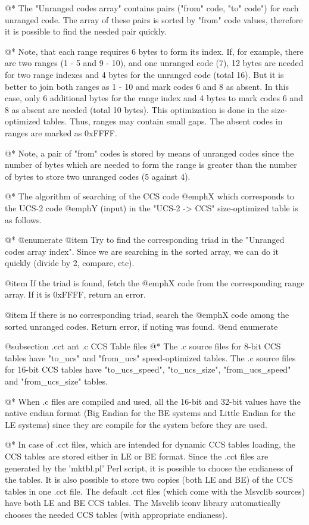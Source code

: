 @*
The "Unranged codes array" contains pairs ("from" code, "to" code") for
each unranged code. The array of these pairs is sorted by "from" code
values, therefore it is possible to find the needed pair quickly.

@*
Note, that each range requires 6 bytes to form its index. If, for
example, there are two ranges (1 - 5 and 9 - 10), and one unranged code
(7), 12 bytes are needed for two range indexes and 4 bytes for the unranged
code (total 16). But it is better to join both ranges as 1 - 10 and
mark codes 6 and 8 as absent. In this case, only 6 additional bytes for the
range index and 4 bytes to mark codes 6 and 8 as absent are needed
(total 10 bytes). This optimization is done in the size-optimized tables.
Thus, ranges may contain small gaps. The absent codes in ranges are marked
as 0xFFFF.

@*
Note, a pair of "from" codes is stored by means of unranged codes since
the number of bytes which are needed to form the range is greater than
the number of bytes to store two unranged codes (5 against 4).

@*
The algorithm of searching of the CCS code
@emph{X} which corresponds to the UCS-2 code @emph{Y} (input) in the "UCS-2 ->
CCS" size-optimized table is as follows.

@*
@enumerate
@item Try to find the corresponding triad in the "Unranged codes array
index". Since we are searching in the sorted array, we can do it quickly
(divide by 2, compare, etc).

@item If the triad is found, fetch the @emph{X} code from the corresponding
range array. If it is 0xFFFF, return an error.

@item If there is no corresponding triad, search the @emph{X} code among the
sorted unranged codes. Return error, if noting was found.
@end enumerate

@subsection .cct ant .c CCS Table files
@*
The .c source files for 8-bit CCS tables have "to_ucs" and "from_ucs"
speed-optimized tables. The .c source files for 16-bit CCS tables have
"to_ucs_speed", "to_ucs_size", "from_ucs_speed" and "from_ucs_size"
tables.

@*
When .c files are compiled and used, all the 16-bit and 32-bit values
have the native endian format (Big Endian for the BE systems and Little
Endian for the LE systems) since they are compile for the system before
they are used.

@*
In case of .cct files, which are intended for dynamic CCS tables
loading, the CCS tables are stored either in LE or BE format. Since the
.cct files are generated by the 'mktbl.pl' Perl script, it is possible
to choose the endianess of the tables. It is also possible to store two
copies (both LE and BE) of the CCS tables in one .cct file. The default
.cct files (which come with the Msvclib sources) have both LE and BE CCS
tables. The Msvclib iconv library automatically chooses the needed CCS tables
(with appropriate endianess).

